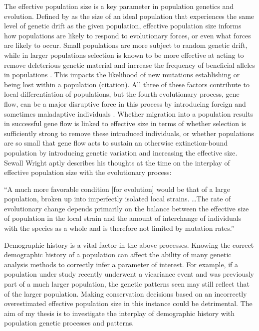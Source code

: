 The effective population size is a key parameter in population genetics and evolution. Defined by \citet{Wright:1931} as the size of an ideal population that experiences the same level of genetic drift as the given population, effective population size informs how populations are likely to respond to evolutionary forces, or even what forces are likely to occur. Small populations are more subject to random genetic drift, while in larger populations selection is known to be more effective at acting to remove deleterious genetic material and increase the frequency of beneficial alleles in populations \citep{Gravel:2016}. This impacts the likelihood of new mutations establishing or being lost within a population (\color{red}citation\color{black}). All three of these factors contribute to local differentiation of populations, but the fourth evolutionary process, gene flow, can be a major disruptive force in this process by introducing foreign and sometimes maladaptive individuals \citep{Slatkin:1987}. Whether migration into a population results in successful gene flow is linked to effective size in terms of whether selection is sufficiently strong to remove these introduced individuals, or whether populations are so small that gene flow acts to sustain an otherwise extinction-bound population by introducing genetic variation and increasing the effective size. Sewall Wright aptly describes his thoughts at the time on the interplay of effective population size with the evolutionary process:
\begin{quoteshrink}
  ``A much more favorable condition [for evolution] would be that of a large population, broken up into imperfectly isolated local strains. \ldots The rate of evolutionary change depends primarily on the balance between the effective size of population in the local strain and the amount of interchange of individuals with the species as a whole and is therefore not limited by mutation rates.''
  \hfill\citet{Wright:1930}
\end{quoteshrink}

Demographic history is a vital factor in the above processes. Knowing the correct demographic history of a population can affect the ability of many genetic analysis methods to correctly infer a parameter of interest. For example, if a population under study recently underwent a vicariance event and was previously part of a much larger population, the genetic patterns seen may still reflect that of the larger population. Making conservation decisions based on an incorrectly overestimated effective population size in this instance could be detrimental. The aim of my thesis is to investigate the interplay of demographic history with population genetic processes and patterns.

